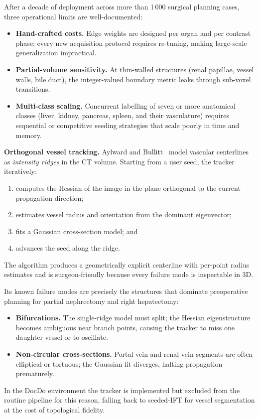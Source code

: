 \documentclass[a4paper,11pt,twoside]{article}
\begin{document}
After a decade of deployment across more than 1\,000 surgical planning cases,
three operational limits are well-documented:
\begin{itemize}
  \item \textbf{Hand-crafted costs.} Edge weights are designed per organ and
        per contrast phase; every new acquisition protocol requires
        re-tuning, making large-scale generalization impractical.
  \item \textbf{Partial-volume sensitivity.} At thin-walled structures
        (renal papillae, vessel walls, bile duct), the integer-valued
        boundary metric leaks through sub-voxel transitions.
  \item \textbf{Multi-class scaling.} Concurrent labelling of seven or more
        anatomical classes (liver, kidney, pancreas, spleen, and their
        vasculature) requires sequential or competitive seeding strategies
        that scale poorly in time and memory.
\end{itemize}

\textbf{Orthogonal vessel tracking.}
Aylward and Bullitt~\cite{aylward2002vessel} model vascular centerlines as
\emph{intensity ridges} in the CT volume.  Starting from a user seed, the
tracker iteratively:
\begin{enumerate}[label=(\alph*), noitemsep, topsep=3pt]
  \item computes the Hessian of the image in the plane orthogonal to the
        current propagation direction;
  \item estimates vessel radius and orientation from the dominant eigenvector;
  \item fits a Gaussian cross-section model; and
  \item advances the seed along the ridge.
\end{enumerate}
The
algorithm produces a geometrically explicit centerline with per-point radius
estimates and is surgeon-friendly because every failure mode is
inspectable in 3D.

Its known failure modes are precisely the structures that dominate
preoperative planning for partial nephrectomy and right hepatectomy:
\begin{itemize}
  \item \textbf{Bifurcations.} The single-ridge model must split;
        the Hessian eigenstructure becomes ambiguous near branch points,
        causing the tracker to miss one daughter vessel or to oscillate.
  \item \textbf{Non-circular cross-sections.} Portal vein and renal vein
        segments are often elliptical or tortuous; the Gaussian fit
        diverges, halting propagation prematurely.
\end{itemize}
In the DocDo environment the tracker is implemented but excluded from the
routine pipeline for this reason, falling back to seeded-IFT for vessel
segmentation at the cost of topological fidelity.
\end{document}
